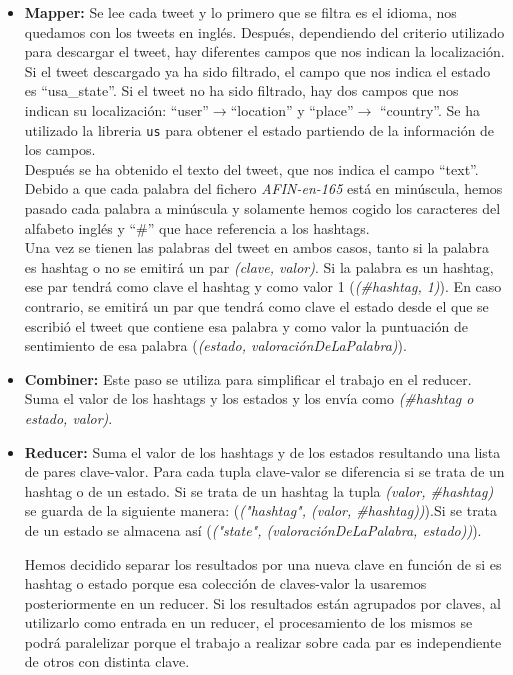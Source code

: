 \documentclass[12pt,a4paper]{article}
\begin{document}
\begin{itemize}
\item \textbf{Mapper:} Se lee cada tweet y lo primero que se filtra es el idioma, nos quedamos con los tweets en inglés. Después, dependiendo del criterio utilizado para descargar el tweet, hay diferentes campos que nos indican la localización. Si el tweet descargado ya ha sido filtrado, el campo que nos indica el estado es ``usa\_state''. Si el tweet no ha sido filtrado, hay dos campos que nos indican su localización: ``user''$\rightarrow$``location'' y ``place''$\rightarrow$ ``country''. Se ha utilizado la libreria \texttt{us} para obtener el estado partiendo de la información de los campos.\\

Después se ha obtenido el texto del tweet, que nos indica el campo ``text''. Debido a que cada palabra del fichero \textit{AFIN-en-165} está en minúscula, hemos pasado cada palabra a minúscula y solamente hemos cogido los caracteres del alfabeto inglés y ``\#'' que hace referencia a los hashtags.\\

Una vez se tienen las palabras del tweet en ambos casos, tanto si la palabra es hashtag o no se emitirá un par \textit{(clave, valor)}. Si la palabra es un hashtag, ese par tendrá como clave el hashtag y como valor 1 (\textit{(\#hashtag, 1)}). En caso contrario, se emitirá un par que tendrá como clave el estado desde el que se escribió el tweet que contiene esa palabra y como valor la puntuación de sentimiento de esa palabra (\textit{(estado, valoraciónDeLaPalabra)}).

\item \textbf{Combiner:} Este paso se utiliza para simplificar el trabajo en el reducer. Suma el valor de los hashtags y los estados y los envía como \textit{(\#hashtag o estado, valor)}.

\item \textbf{Reducer:} Suma el valor de los hashtags y de los estados resultando una lista de pares clave-valor. Para cada tupla clave-valor se diferencia si se trata de un hashtag o de un estado. Si se trata de un hashtag la tupla \textit{(valor, \#hashtag)} se guarda de la siguiente manera: (\textit{("hashtag", (valor, \#hashtag))}).Si se trata de un estado se almacena así (\textit{("state", (valoraciónDeLaPalabra, estado))}).

Hemos decidido separar los resultados por una nueva clave en función de si es hashtag o estado porque esa colección de claves-valor la usaremos posteriormente en un reducer. Si los resultados están agrupados por claves, al utilizarlo como entrada en un reducer, el procesamiento de los mismos se podrá paralelizar porque el trabajo a realizar sobre cada par es independiente de otros con distinta clave.


\end{itemize}
\end{document}
